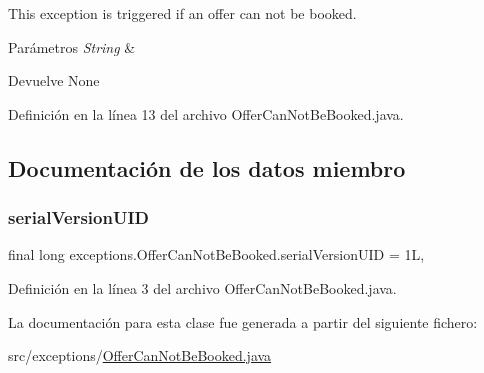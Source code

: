 This exception is triggered if an offer can not be booked. 


\begin{DoxyParams}{Parámetros}
{\em String} & \\
\hline
\end{DoxyParams}
\begin{DoxyReturn}{Devuelve}
None 
\end{DoxyReturn}


Definición en la línea 13 del archivo Offer\+Can\+Not\+Be\+Booked.\+java.


\begin{DoxyCode}{0}

\end{DoxyCode}


\subsection{Documentación de los datos miembro}
\mbox{\label{classexceptions_1_1_offer_can_not_be_booked_a0f0deac6a5fe9077f31bd1c90f1b0b59}} 
\subsubsection{\texorpdfstring{serialVersionUID}{serialVersionUID}}
{\footnotesize\ttfamily final long exceptions.\+Offer\+Can\+Not\+Be\+Booked.\+serial\+Version\+U\+ID = 1L\hspace{0.3cm}{\ttfamily [static]}, {\ttfamily [private]}}



Definición en la línea 3 del archivo Offer\+Can\+Not\+Be\+Booked.\+java.



La documentación para esta clase fue generada a partir del siguiente fichero\+:\begin{DoxyCompactItemize}
\item 
src/exceptions/\mbox{\hyperlink{_offer_can_not_be_booked_8java}{Offer\+Can\+Not\+Be\+Booked.\+java}}\end{DoxyCompactItemize}

